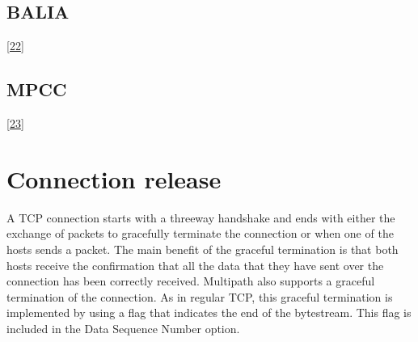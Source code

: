 \documentclass[letterpaper,10pt,english]{sphinxmanual}
\begin{document}
\subsection{BALIA}
\label{\detokenize{mptcp:balia}}
\sphinxAtStartPar
{[}\hyperlink{cite.biblio:id8993}{22}{]}


\subsection{MPCC}
\label{\detokenize{mptcp:mpcc}}
\sphinxAtStartPar
{[}\hyperlink{cite.biblio:id9002}{23}{]}


\section{Connection release}
\label{\detokenize{mptcp:connection-release}}\label{\detokenize{mptcp:mptcp-release}}
\sphinxAtStartPar
A TCP connection starts with a three\sphinxhyphen{}way handshake and ends with either the exchange of  packets to gracefully terminate the connection or when one of the hosts sends a  packet. The main benefit of the graceful termination is that both hosts receive the confirmation that all the data that they have sent over the connection has been correctly received. Multipath also supports a graceful termination of the connection. As in regular TCP, this graceful termination is implemented by using a flag that indicates the end of the bytestream. This flag is included in the Data Sequence Number option.
\end{document}

